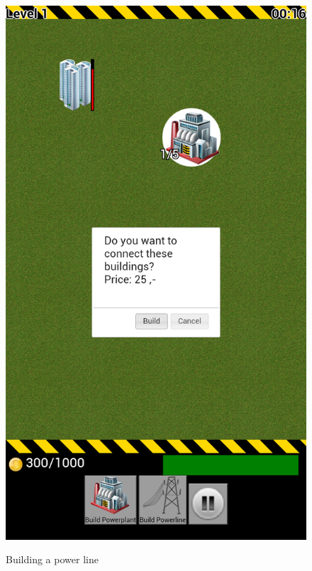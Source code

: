\begin{figure}[H]
{		\includegraphics[scale=0.18]{pictures/sprint4-screen/buildpowercable2}
	}
	\caption{Building a power line}
\end{figure}

